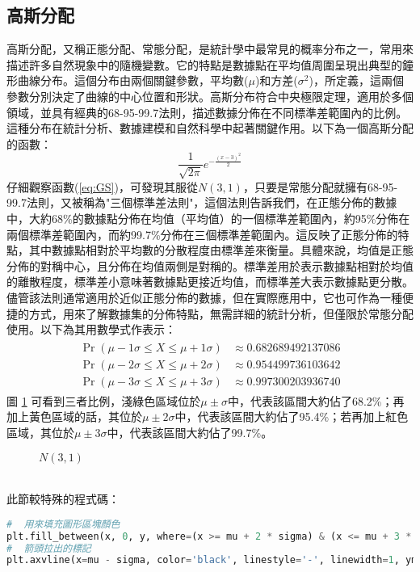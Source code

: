 \subsection{高斯分配}
高斯分配，又稱正態分配、常態分配，是統計學中最常見的概率分布之一，常用來描述許多自然現象中的隨機變數。它的特點是數據點在平均值周圍呈現出典型的鐘形曲線分布。這個分布由兩個關鍵參數，平均數($\mu$)和方差($\sigma^2$)，所定義，這兩個參數分別決定了曲線的中心位置和形狀。高斯分布符合中央極限定理，適用於多個領域，並具有經典的68-95-99.7法則，描述數據分佈在不同標準差範圍內的比例。這種分布在統計分析、數據建模和自然科學中起著關鍵作用。以下為一個高斯分配的函數：
\begin{equation}\label{eq:GS}
\frac{1}{\sqrt{2\pi}}e^{-\frac{(x-3)^2}{2}}
\end{equation}
仔細觀察函數(\ref{eq:GS})，可發現其服從$N(3,1)$，只要是常態分配就擁有68-95-99.7法則，又被稱為"三個標準差法則"，這個法則告訴我們，在正態分佈的數據中，大約68\%的數據點分佈在均值（平均值）的一個標準差範圍內，約95\%分佈在兩個標準差範圍內，而約99.7\%分佈在三個標準差範圍內。這反映了正態分佈的特點，其中數據點相對於平均數的分散程度由標準差來衡量。具體來說，均值是正態分佈的對稱中心，且分佈在均值兩側是對稱的。標準差用於表示數據點相對於均值的離散程度，標準差小意味著數據點更接近均值，而標準差大表示數據點更分散。儘管該法則通常適用於近似正態分佈的數據，但在實際應用中，它也可作為一種便捷的方式，用來了解數據集的分佈特點，無需詳細的統計分析，但僅限於常態分配使用。以下為其用數學式作表示：
\begin{align*}
{\displaystyle {\begin{aligned}\Pr(\mu -1\sigma \leq X\leq \mu +1\sigma )&\approx 0.682689492137086\\
\Pr(\mu -2\sigma \leq X\leq \mu +2\sigma )&\approx 0.954499736103642\\
\Pr(\mu -3\sigma \leq X\leq \mu +3\sigma )&\approx 0.997300203936740\end{aligned}}}
\end{align*}
圖 \ref{fig:GS} 可看到三者比例，淺綠色區域位於$\mu \pm \sigma$中，代表該區間大約佔了68.2\%；再加上黃色區域的話，其位於$\mu \pm 2\sigma$中，代表該區間大約佔了95.4\%；若再加上紅色區域，其位於$\mu \pm 3\sigma$中，代表該區間大約佔了99.7\%。
\begin{figure}[h]
    \caption{$N(3,1)$}
    \label{fig:GS}
\end{figure}\\
此節較特殊的程式碼：
\begin{lstlisting}[language=Python]
#  用來填充圖形區塊顏色
plt.fill_between(x, 0, y, where=(x >= mu + 2 * sigma) & (x <= mu + 3 * sigma), color='red', alpha=0.4)
#  箭頭拉出的標記
plt.axvline(x=mu - sigma, color='black', linestyle='-', linewidth=1, ymin=0.045,ymax=0.6)
\end{lstlisting}

